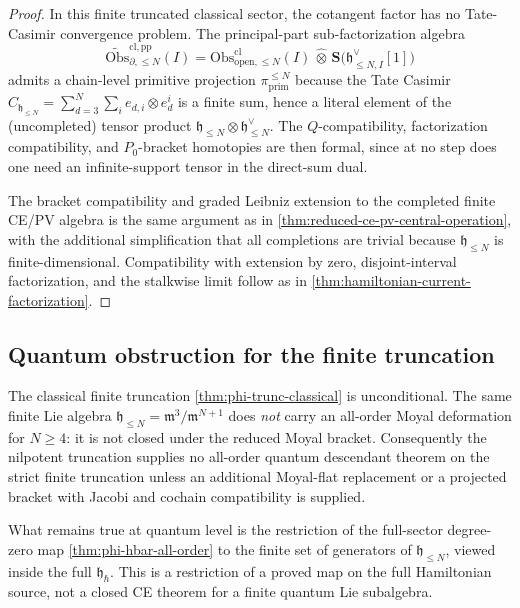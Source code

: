 \begin{proof}
In this finite truncated classical sector, the cotangent factor has no
Tate-Casimir convergence problem. The principal-part sub-factorization algebra
$$\widetilde{\mathrm{Obs}}^{\mathrm{cl,pp}}_{\partial,\leq N}(I)
  =\mathrm{Obs}^{\mathrm{cl}}_{\mathrm{open},\leq N}(I)
   \,\widehat\otimes\,
   \widehat{\mathbf S}\bigl(\mathfrak h_{\leq N,I}^\vee[1]\bigr)$$
    admits a chain-level primitive projection
    $\pi_{\mathrm{prim}}^{\leq N}$ because the Tate Casimir
    $C_{\mathfrak h_{\leq N}}=\sum_{d=3}^N\sum_i e_{d,i}\otimes e_d^i$
is a finite sum, hence a literal element of the (uncompleted) tensor
product $\mathfrak h_{\leq N}\otimes\mathfrak h_{\leq N}^\vee$. The
$Q$-compatibility, factorization compatibility, and $P_0$-bracket
homotopies are then formal, since at no step does one need an
infinite-support tensor in the direct-sum dual.

The bracket compatibility and graded Leibniz extension to the completed
finite CE/PV algebra is the same argument as in
\ref{thm:reduced-ce-pv-central-operation}, with the additional
simplification that all completions are trivial because
$\mathfrak h_{\leq N}$ is finite-dimensional. Compatibility with
extension by zero, disjoint-interval factorization, and the
stalkwise limit follow as in
\ref{thm:hamiltonian-current-factorization}.
\end{proof}

\subsection*{Quantum obstruction for the finite truncation}

\begin{thm}
\label{thm:phi-hbar-trunc}
  The classical finite truncation
  \ref{thm:phi-trunc-classical} is unconditional.  The same finite
  Lie algebra
  $\mathfrak h_{\leq N}=\mathfrak m^3/\mathfrak m^{N+1}$ does
  \emph{not} carry an all-order Moyal deformation for $N\geq4$:
  it is not closed under the reduced Moyal bracket. Consequently the
  nilpotent truncation
  supplies no all-order quantum descendant theorem on the strict
  finite truncation unless an additional Moyal-flat replacement or a
  projected bracket with Jacobi and cochain compatibility is supplied.

  What remains true at quantum level is the restriction of the
  full-sector degree-zero map
  \ref{thm:phi-hbar-all-order} to the finite set of generators of
  $\mathfrak h_{\leq N}$, viewed inside the full
  $\mathfrak h_\hbar$.  This is a restriction of a proved map on the
  full Hamiltonian source, not a closed CE theorem for a finite
  quantum Lie subalgebra.
\end{thm}

